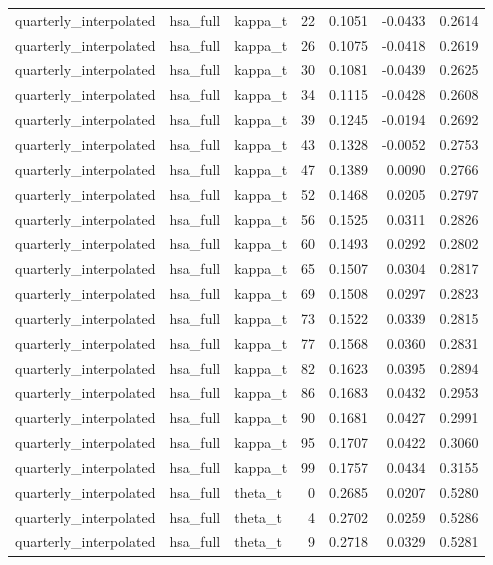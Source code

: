 \begin{tabular}{lllrrrr}
quarterly\_interpolated & hsa\_full & kappa\_t & 22 & 0.1051 & -0.0433 & 0.2614 \\
quarterly\_interpolated & hsa\_full & kappa\_t & 26 & 0.1075 & -0.0418 & 0.2619 \\
quarterly\_interpolated & hsa\_full & kappa\_t & 30 & 0.1081 & -0.0439 & 0.2625 \\
quarterly\_interpolated & hsa\_full & kappa\_t & 34 & 0.1115 & -0.0428 & 0.2608 \\
quarterly\_interpolated & hsa\_full & kappa\_t & 39 & 0.1245 & -0.0194 & 0.2692 \\
quarterly\_interpolated & hsa\_full & kappa\_t & 43 & 0.1328 & -0.0052 & 0.2753 \\
quarterly\_interpolated & hsa\_full & kappa\_t & 47 & 0.1389 & 0.0090 & 0.2766 \\
quarterly\_interpolated & hsa\_full & kappa\_t & 52 & 0.1468 & 0.0205 & 0.2797 \\
quarterly\_interpolated & hsa\_full & kappa\_t & 56 & 0.1525 & 0.0311 & 0.2826 \\
quarterly\_interpolated & hsa\_full & kappa\_t & 60 & 0.1493 & 0.0292 & 0.2802 \\
quarterly\_interpolated & hsa\_full & kappa\_t & 65 & 0.1507 & 0.0304 & 0.2817 \\
quarterly\_interpolated & hsa\_full & kappa\_t & 69 & 0.1508 & 0.0297 & 0.2823 \\
quarterly\_interpolated & hsa\_full & kappa\_t & 73 & 0.1522 & 0.0339 & 0.2815 \\
quarterly\_interpolated & hsa\_full & kappa\_t & 77 & 0.1568 & 0.0360 & 0.2831 \\
quarterly\_interpolated & hsa\_full & kappa\_t & 82 & 0.1623 & 0.0395 & 0.2894 \\
quarterly\_interpolated & hsa\_full & kappa\_t & 86 & 0.1683 & 0.0432 & 0.2953 \\
quarterly\_interpolated & hsa\_full & kappa\_t & 90 & 0.1681 & 0.0427 & 0.2991 \\
quarterly\_interpolated & hsa\_full & kappa\_t & 95 & 0.1707 & 0.0422 & 0.3060 \\
quarterly\_interpolated & hsa\_full & kappa\_t & 99 & 0.1757 & 0.0434 & 0.3155 \\
quarterly\_interpolated & hsa\_full & theta\_t & 0 & 0.2685 & 0.0207 & 0.5280 \\
quarterly\_interpolated & hsa\_full & theta\_t & 4 & 0.2702 & 0.0259 & 0.5286 \\
quarterly\_interpolated & hsa\_full & theta\_t & 9 & 0.2718 & 0.0329 & 0.5281 \\

\end{tabular}

